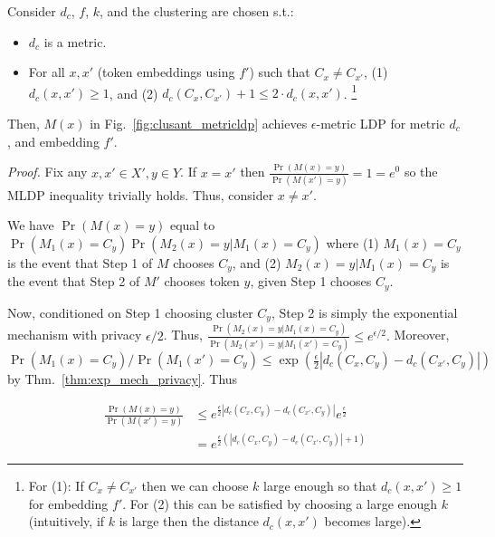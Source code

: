 \begin{theorem}\label{thm:clusant_mldp}
    Consider $d_c$, $f$, $k$, and the clustering are chosen s.t.: 
    \begin{itemize}
    \setlength\itemsep{0em}
    \item $d_c$ is a metric.
    \item For all $x, x'$ (token embeddings using $f'$) such that $C_x\not = C_{x'}$, (1) $d_c(x, x') \geq 1$, and (2) 
    $d_c(C_x, C_{x'}) + 1 \leq 2\cdot d_c(x, x')$.  \footnote{For (1): 
    If $C_x \not= C_{x'}$ then we can choose $k$ large enough so that $d_c(x, x') \geq 1$ for embedding $f'$. For (2) this can be satisfied by choosing a large enough $k$ (intuitively, if $k$ is large then the distance $d_c(x, x')$ becomes large).}
\end{itemize}



  Then, $M(x)$ in Fig.~\ref{fig:clusant_metricldp}  achieves $\epsilon$-metric LDP for metric $d_c$, and embedding $f'$.
\end{theorem}

\noindent
\textit{Proof.} 
Fix any $x, x' \in X', y \in Y$. If $x = x'$ then $\frac{\Pr(M(x) = y)}{\Pr(M(x') = y)} = 1 = e^0$ so the MLDP inequality trivially holds. 
Thus, consider $x \not= x'$. 

We have $\Pr(M(x) = y)$ equal to $\Pr(M_1(x) = C_y)\Pr(M_2(x) = y | M_1(x) = C_y)$ where (1) $M_1(x) = C_y$ is the event that Step 1 of $M$ chooses $C_y$, and (2) $M_2(x) = y | M_1(x) = C_y$ is the event that Step 2 of $M'$ chooses token $y$, given Step 1 chooses $C_y$. 


Now, conditioned on  Step 1 choosing cluster $C_y$, Step 2 is simply the exponential mechanism with privacy $\epsilon/2$. Thus, $\frac{\Pr(M_2(x) = y | M_1(x) = C_y)}{\Pr(M_2(x') = y | M_1(x') = C_y)} \leq e^{\epsilon/2}.$ Moreover, $\Pr(M_1(x) = C_y)/\Pr(M_1(x') = C_y) \leq \exp(\frac{\epsilon}{2} |d_c(C_x, C_y) - d_c(C_{x'}, C_y)|)$ by Thm.~\ref{thm:exp_mech_privacy}. Thus

\begin{align*}
        \frac{\Pr(M(x) = y)}{\Pr(M(x') = y)} & \leq e^{\frac{\epsilon}{2} |d_c(C_x, C_y) - d_c(C_{x'}, C_y)|} e^{\frac{\epsilon}{2}}\\
        &= e^{\frac{\epsilon}{2}(|d_c(C_x, C_y) - d_c(C_{x'},  C_y)| +1)}
\end{align*}


